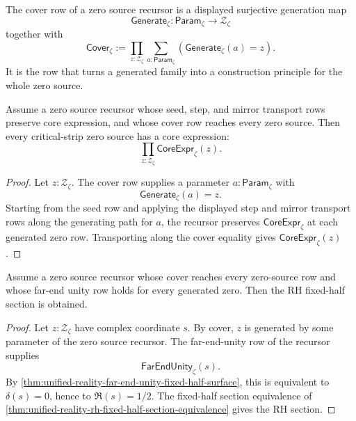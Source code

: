 \begin{definition}
\label{def:unified-reality-zero-source-cover}
The cover row of a zero source recursor is a displayed surjective
generation map
$$
\mathsf{Generate}_{\zeta}:\mathsf{Param}_{\zeta}\to\mathcal Z_{\zeta}
$$
together with
$$
\mathsf{Cover}_{\zeta}
:=
\prod_{z:\mathcal Z_{\zeta}}
\sum_{a:\mathsf{Param}_{\zeta}}
\left(
\mathsf{Generate}_{\zeta}(a)=z
\right).
$$
It is the row that turns a generated family into a construction principle
for the whole zero source.
\end{definition}

\begin{theorem}
\label{thm:unified-reality-covered-recursor-transports-core-expression}
Assume a zero source recursor whose seed, step, and mirror transport rows
preserve core expression, and whose cover row reaches every zero source.
Then every critical-strip zero source has a core expression:
$$
\prod_{z:\mathcal Z_{\zeta}}
\mathsf{CoreExpr}_{\zeta}(z).
$$
\end{theorem}

\begin{proof}
Let $z:\mathcal Z_{\zeta}$.  The cover row supplies a parameter
$a:\mathsf{Param}_{\zeta}$ with
$$
\mathsf{Generate}_{\zeta}(a)=z.
$$
Starting from the seed row and applying the displayed step and mirror
transport rows along the generating path for $a$, the recursor preserves
$\mathsf{CoreExpr}_{\zeta}$ at each generated zero row.  Transporting
along the cover equality gives $\mathsf{CoreExpr}_{\zeta}(z)$.
\end{proof}


\begin{theorem}
\label{thm:unified-reality-covered-far-end-unified-recursor-gives-rh-section}
Assume a zero source recursor whose cover reaches every zero-source row
and whose far-end unity row holds for every generated zero.  Then the RH
fixed-half section is obtained.
\end{theorem}

\begin{proof}
Let $z:\mathcal Z_{\zeta}$ have complex coordinate $s$.  By cover, $z$
is generated by some parameter of the zero source recursor.  The
far-end-unity row of the recursor supplies
$$
\mathsf{FarEndUnity}_{\zeta}(s).
$$
By
\autoref{thm:unified-reality-far-end-unity-fixed-half-surface}, this is
equivalent to $\delta(s)=0$, hence to $\Re(s)=1/2$.  The fixed-half
section equivalence of
\autoref{thm:unified-reality-rh-fixed-half-section-equivalence} gives
the RH section.
\end{proof}

